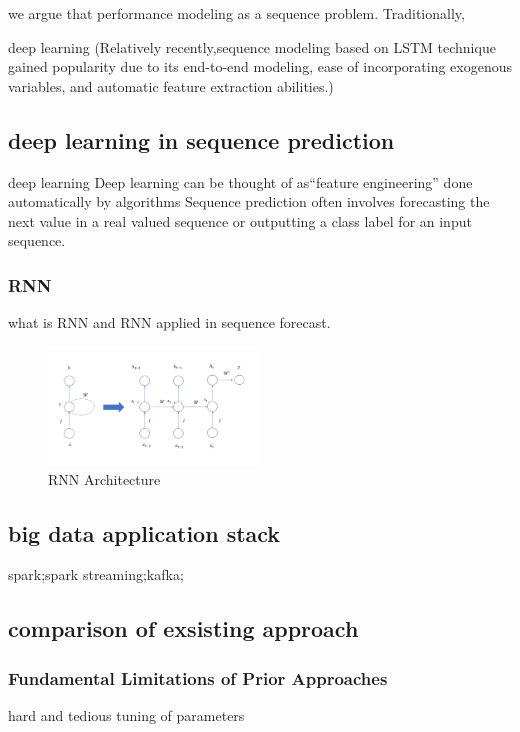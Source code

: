\documentclass[review]{elsarticle}
\begin{document}
we argue that performance modeling as a sequence problem. Traditionally, 

deep learning (Relatively recently,sequence modeling based on LSTM technique gained popularity due to its end-to-end modeling, ease of incorporating exogenous variables, and automatic feature extraction abilities.\cite{Zhu2017DeepUber})

\subsection{deep learning in sequence prediction}
deep learning
     Deep learning can be thought of as“feature engineering” done automatically by algorithms
Sequence prediction often involves forecasting the next value in a real valued sequence or outputting a class label for an input sequence.
\subsubsection{RNN}
\cite{Bengio1994LearningDifficult}
\cite{ChoLearningTranslation}

what is RNN and RNN applied in sequence forecast.

\begin{figure}[h]
    \centering
    \includegraphics[width=0.5\textwidth]{RNN.png}
    \caption{RNN Architecture}
    \label{fig:RNN}
\end{figure}



\subsection{big data application stack}
spark\cite{ZahariaSpark:Sets};spark streaming\cite{ZahariaDiscretizedClusters};kafka;
\subsection{comparison of exsisting approach}
\subsubsection{Fundamental Limitations of Prior Approaches}
hard and tedious tuning of parameters
\end{document}
